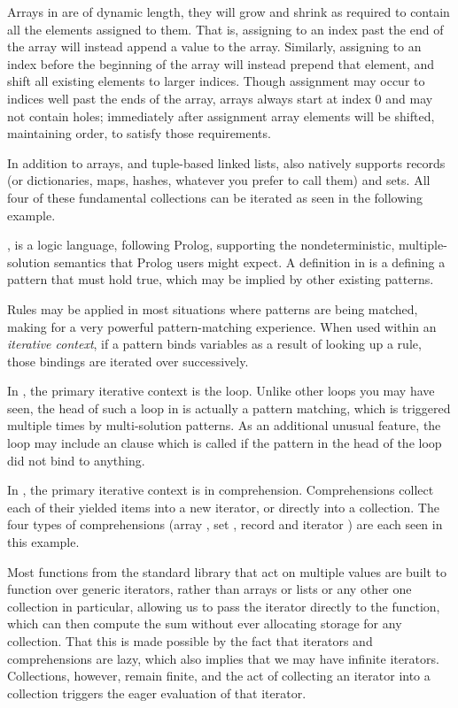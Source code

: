 Arrays in \Trilogy{} are of dynamic length, they will grow and shrink as required
to contain all the elements assigned to them. That is, assigning to an index past
the end of the array will instead append a value to the array. Similarly, assigning
to an index before the beginning of the array will instead prepend that element, and
shift all existing elements to larger indices. Though assignment may occur to indices
well past the ends of the array, arrays always start at index 0 and may not contain
holes; immediately after assignment array elements will be shifted, maintaining order,
to satisfy those requirements.

In addition to arrays, and tuple-based linked lists, \Trilogy{} also natively
supports records (or dictionaries, maps, hashes, whatever you prefer to call them)
and sets. All four of these fundamental collections can be iterated as seen in the
following example.


\Law{}, is a logic language, following Prolog, supporting the nondeterministic,
multiple-solution semantics that Prolog users might expect. A definition in \Law{}
is a  defining a pattern that must hold true, which may be implied by
other existing patterns.

Rules may be applied in most situations where patterns are being matched, making
for a very powerful pattern-matching experience. When used within an \emph{iterative
context}, if a pattern binds variables as a result of looking up a rule, those bindings
are iterated over successively.

In \Prose{}, the primary iterative context is the  loop. Unlike other
 loops you may have seen, the head of such a loop in \Prose{} is actually
a pattern matching, which is triggered multiple times by multi-solution patterns.
As an additional unusual feature, the  loop may include an  clause
which is called if the pattern in the head of the loop did not bind to anything.

In \Poetry{}, the primary iterative context is in comprehension. Comprehensions
collect each of their yielded items into a new iterator, or directly into a
collection. The four types of comprehensions (array \op{[]}, set \op{\{\}},
record \op{\{:\}} and iterator \op{\$()}) are each seen in this example.

Most functions from the standard library that act on multiple values are built to
function over generic iterators, rather than arrays or lists or any other one
collection in particular, allowing us to pass the iterator directly to the
 function, which can then compute the sum without ever allocating storage
for any collection. That this is made possible by the fact that iterators
and comprehensions are lazy, which also implies that we may have infinite
iterators. Collections, however, remain finite, and the act of collecting
an iterator into a collection triggers the eager evaluation of that iterator.

